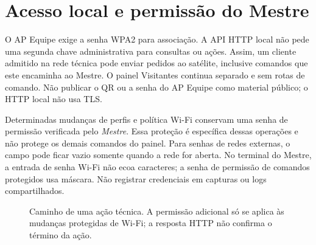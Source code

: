 \section{Acesso local e permissão do Mestre}\label{sec:acesso-web}
O AP Equipe exige a senha WPA2 para associação. A API HTTP local não pede uma segunda chave administrativa para consultas ou ações. Assim, um cliente admitido na rede técnica pode enviar pedidos ao satélite, inclusive comandos que este encaminha ao Mestre. O painel Visitantes continua separado e sem rotas de comando. Não publicar o QR ou a senha do AP Equipe como material público; o HTTP local não usa TLS.

Determinadas mudanças de perfis e política Wi-Fi conservam uma senha de permissão verificada pelo \emph{Mestre}. Essa proteção é específica dessas operações e não protege os demais comandos do painel. Para senhas de redes externas, o campo pode ficar vazio somente quando a rede for aberta. No terminal do Mestre, a entrada de senha Wi-Fi não ecoa caracteres; a senha de permissão de comandos protegidos usa máscara. Não registrar credenciais em capturas ou logs compartilhados.

\begin{figure}[htbp]\centering
{}
\caption{Caminho de uma ação técnica. A permissão adicional só se aplica às mudanças protegidas de Wi-Fi; a resposta HTTP não confirma o término da ação.}\label{fig:camadas-acesso}
\end{figure}

